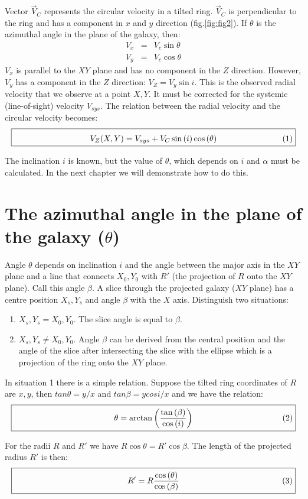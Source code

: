\documentclass[11pt,a4paper]{article}
\newcommand{\sinb}[1]{\sin \left( #1 \right)}
\newcommand{\cosb}[1]{\cos \left( #1 \right)}
\newcommand{\tanb}[1]{\tan \left( #1 \right)}
\newcommand{\atanb}[1]{\arctan \left( #1 \right)}
\newcommand{\boxedeqn}[1]{%
  \[\fbox{%
      \addtolength{\linewidth}{-2\fboxsep}%
      \addtolength{\linewidth}{-2\fboxrule}%
      \begin{minipage}{\linewidth}%
      \begin{equation}#1\end{equation}%
      \end{minipage}%
    }\]%
}
\begin{document}
Vector $\vec V_C$ represents the circular velocity in a tilted ring.
$\vec V_C$ is perpendicular to the ring and has a component in $x$ and 
$y$ direction (fig.\ref{fig:fig2}). If $\theta$ is the azimuthal angle in the plane of the galaxy,
then:
\begin{equation}
\begin{array} {rcl}
V_x & = & V_c \sin \theta \nonumber \\
V_y & = & V_c \cos \theta \nonumber 
\end{array}
\end{equation}
$V_x$ is parallel to the $XY$ plane and has no component in the $Z$ direction.
However, $V_y$ has a component in the $Z$ direction: $V_Z = V_y \sin i$. This is
the observed radial velocity that we observe at a point $X,Y$. 
It must be corrected for the systemic (line-of-sight) velocity $V_{sys}$.
The relation between the radial velocity and the circular velocity becomes:
\boxedeqn{
V_Z(X,Y) = V_{sys} + V_C \sinb{i} \cosb{\theta}
\label{Vz}
}
The inclination $i$ is known, but the value of $\theta$, which depends on
$i$ and $\alpha$ must be calculated. In the next chapter we 
will demonstrate how to do this.


\section{The azimuthal angle in the plane of the galaxy ($\theta$)}
 
Angle $\theta$ depends on inclination $i$ and the angle between 
the major axis in the $XY$ plane and a line that connects 
$X_0,Y_0$ with $R'$ (the projection
of $R$ onto the $XY$ plane). Call this angle $\beta$. 
A slice through the projected galaxy ($XY$ plane) has a centre position
$X_s,Y_s$ and angle $\beta$ with the $X$ axis. Distinguish two situations:
\begin{enumerate}
\item $X_s,Y_s = X_0,Y_0$. The slice angle is equal to $\beta$.
\item $X_s,Y_s \ne X_0,Y_0$. Angle $\beta$ can be derived from 
the central position and the angle of the slice after intersecting the
slice with the ellipse which is a projection of the ring onto the $XY$ plane.
\end{enumerate}
In situation 1 there is a simple relation. Suppose the tilted ring coordinates
of $R$ are $x,y$, then $tan \theta = y/x$ and $tan \beta = {y cos i}/x$ and 
we have the relation:
\boxedeqn{
\theta = \atanb{ {{\tanb{\beta}}\over{\cosb{i}}} }
}
For the radii $R$ and $R'$ we have $R \cos \theta = R' \cos \beta$. The length 
of the projected radius $R'$ is then:
\boxedeqn{
R' = R {{\cosb{\theta}}\over{\cosb{\beta}}}
}
\end{document}
